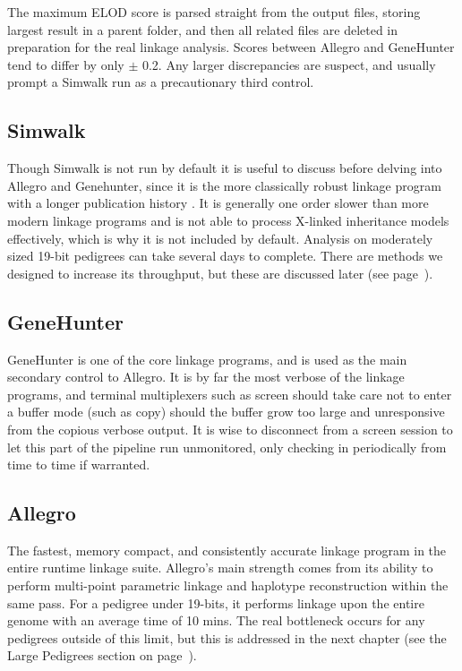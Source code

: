 The maximum ELOD score is parsed straight from the output files, storing largest result in a parent folder, and then all related files are deleted in preparation for the real linkage analysis. Scores between Allegro and GeneHunter tend to differ by only $\pm$ 0.2. Any larger discrepancies are suspect, and usually prompt a Simwalk run as a precautionary third control.

\subsection{Simwalk}

Though Simwalk is not run by default it is useful to discuss before delving into Allegro and Genehunter, since it is the more classically robust linkage program with a longer publication history \cite{simwalk}. It is generally one order slower than more modern linkage programs and is not able to process X-linked inheritance models effectively, which is why it is not included by default.  Analysis on moderately sized 19-bit pedigrees can take several days to complete. There are methods we designed to increase its throughput, but these are discussed later (see page~\pageref{ref:meth:simwalkmulti}).


\subsection{GeneHunter}

GeneHunter is one of the core linkage programs, and is used as the main secondary control to Allegro. It is by far the most verbose of the linkage programs, and terminal multiplexers such as screen should take care not to enter a buffer mode (such as copy) should the buffer grow too large and unresponsive from the copious verbose output. It is wise to disconnect from a screen session to let this part of the pipeline run unmonitored, only checking in periodically from time to time if warranted.

\subsection{Allegro}

The fastest, memory compact, and consistently accurate linkage program in the entire runtime linkage suite. Allegro's main strength comes from its ability to perform multi-point parametric linkage and haplotype reconstruction within the same pass. For a pedigree under 19-bits, it performs linkage upon the entire genome with an average time of 10 mins. The real bottleneck occurs for any pedigrees outside of this limit, but this is addressed in the next chapter (see the Large Pedigrees section on page~\pageref{ref:meth:largepeds}).


